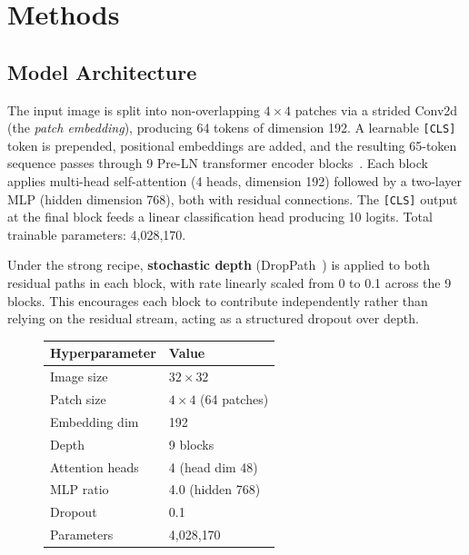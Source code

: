 \section{Methods}\label{sec:methods}

\subsection{Model Architecture}

The input image is split into non-overlapping $4\times4$ patches via a strided Conv2d (the \emph{patch embedding}), producing 64 tokens of dimension 192.
A learnable \texttt{[CLS]} token is prepended, positional embeddings are added, and the resulting 65-token sequence passes through 9 Pre-LN transformer encoder blocks~\cite{dosovitskiy2021vit}.
Each block applies multi-head self-attention (4 heads, dimension 192) followed by a two-layer MLP (hidden dimension 768), both with residual connections.
The \texttt{[CLS]} output at the final block feeds a linear classification head producing 10 logits.
Total trainable parameters: 4{,}028{,}170.

Under the strong recipe, \textbf{stochastic depth} (DropPath~\cite{huang2016deep}) is applied to both residual paths in each block, with rate linearly scaled from 0 to 0.1 across the 9 blocks.
This encourages each block to contribute independently rather than relying on the residual stream, acting as a structured dropout over depth.

\begin{figure}[ht]
    \centering
    \small
    \begin{tabular}{ll}
        \toprule
        Hyperparameter  & Value                   \\
        \midrule
        Image size      & $32\times32$            \\
        Patch size      & $4\times4$ (64 patches) \\
        Embedding dim   & 192                     \\
        Depth           & 9 blocks                \\
        Attention heads & 4 (head dim 48)         \\
        MLP ratio       & 4.0 (hidden 768)        \\
        Dropout         & 0.1                     \\
        Parameters      & 4{,}028{,}170           \\
        \bottomrule
    \end{tabular}
    \label{tab:vit-config}
\end{figure}

